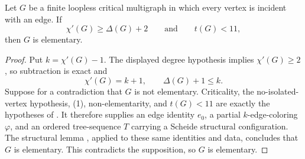 \begin{theorem}
Let $G$ be a finite loopless critical multigraph in which every vertex is
incident with an edge.  If
\[
 \chi'(G)\geq\Delta(G)+2
 \qquad\text{and}\qquad
 t(G)<11,
\]
then $G$ is elementary.
\end{theorem}
\begin{proof}
Put $k=\chi'(G)-1$.  The displayed degree hypothesis implies
$\chi'(G)\geq2$, so subtraction is exact and
\[
 \chi'(G)=k+1,
 \qquad
 \Delta(G)+1\leq k.                                 \tag{1}
\]
Suppose for a contradiction that $G$ is not elementary.  Criticality,
the no-isolated-vertex hypothesis, (1), non-elementarity, and $t(G)<11$
are exactly the hypotheses of
.  It therefore supplies
an edge identity $e_0$, a partial $k$-edge-coloring $\varphi$, and an
ordered tree-sequence $T$ carrying a Scheide structural configuration.
The structural lemma , applied to these
same identities and data, concludes that $G$ is elementary.  This
contradicts the supposition, so $G$ is elementary.
\end{proof}
